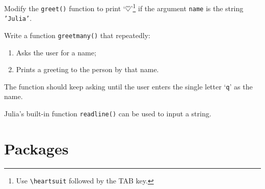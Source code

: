 \documentclass[english,serif,mathserif,xcolor=pdftex,dvipsnames,table]{beamer}
\begin{document}
\begin{frame}
  \begin{exercise*}[2.B]
    Modify the \texttt{greet()} function to print `$\heartsuit$'{}\footnote{Use
      \texttt{{\textbackslash}heartsuit} followed by the TAB key.} if
    the argument \texttt{name} is the string \texttt{'Julia'}.
  \end{exercise*}

  \+
  \begin{exercise*}[2.C]
    Write a function \texttt{greetmany()} that repeatedly:
    \begin{enumerate}
    \item     Asks the user for a name;
    \item     Prints a greeting to the person by that name.
    \end{enumerate}

    The function should keep asking until the user enters the single
    letter `\texttt{q}' as the name.

    Julia's built-in function \texttt{readline()} can be used to input a string.
  \end{exercise*}
\end{frame}


\part{Packages}




\end{document}
